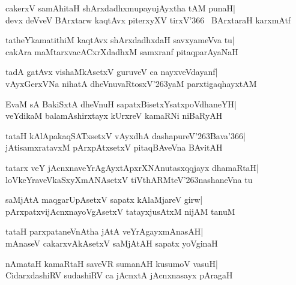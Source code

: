 \documentclass[twoside,12pt,openright]{book}
\def\S{\char'263}
\newcounter{shloka}[chapter]
\begin{document}
\begin{shloka}%
cakerxV samAhitaH shArxdadhxmupayujAyxtha tAM punaH|\\
devx deVveV BArxtarw kaqtAvx piterxyXV tirxV\char'366 \ BArxtaraH karxmAtf
\end{shloka}

\begin{shloka}%
tatheYkamatithiM kaqtAvx shArxdadhxdaH savxyameVva tu|\\
cakAra maMtarxvacACxrXdadhxM samxranf pitaqparAyaNaH
\end{shloka}

\begin{shloka}%
tadA gatAvx vishaMkAsetxV guruveV ca nayxveVdayanf|\\
vAyxGerxVNa nihatA dheVnuvaRtosxV\S yaM parxtigaqhayxtAM
\end{shloka}

\begin{shloka}%
EvaM sA BakiSxtA dheVnuH sapatxBisetxYsatxpoVdhaneYH|\\
veYdikaM balamAshirxtayx kUrxreV kamaRNi niBaRyAH
\end{shloka}

\begin{shloka}%
tataH kAlApakaqSATxsetxV vAyxdhA dashapureV\S Bava\char'366|\\
jAtisamxratavxM pArxpAtxsetxV pitaqBAveVna BAvitAH
\end{shloka}

\begin{shloka}%
tatarx veY jAcnxnaveYrAgAyxtApxrXNAnutasxqqjayx dhamaRtaH|\\
loVkeYraveVkaSxyXmANAsetxV tiVthARMteV\S nashaneVna tu
\end{shloka}

\begin{shloka}%
saMjAtA maqgarUpAsetxV sapatx kAlaMjareV girw|\\
pArxpatxvijAcnxnayoVgAsetxV tatayxjusAtxM nijAM tanuM
\end{shloka}

\begin{shloka}%
tataH parxpataneVnAtha jAtA veYrAgayxmAnasAH|\\
mAnaseV cakarxvAkAsetxV saMjAtAH sapatx yoVginaH
\end{shloka}

\begin{shloka}%
nAmataH kamaRtaH saveVR sumanAH kusumoV vasuH|\\
CidarxdashiRV sudashiRV ca jAcnxtA jAcnxnasayx pAragaH
\end{shloka}
\end{document}

